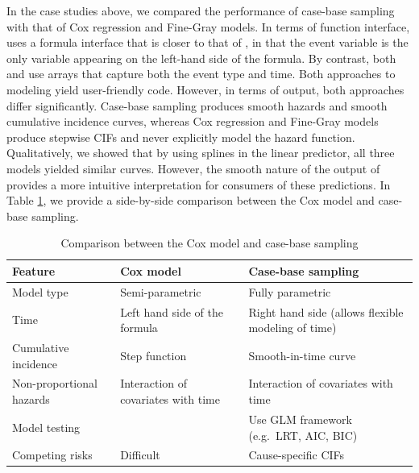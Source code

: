 In the case studies above, we compared the performance of case-base
sampling with that of Cox regression and Fine-Gray models. In terms of
function interface,  uses a formula interface that is
closer to that of , in that the event variable is the only
variable appearing on the left-hand side of the formula. By contrast,
both  and  use arrays
that capture both the event type and time. Both approaches to modeling
yield user-friendly code. However, in terms of output, both approaches
differ significantly. Case-base sampling produces smooth hazards and
smooth cumulative incidence curves, whereas Cox regression and Fine-Gray
models produce stepwise CIFs and never explicitly model the hazard
function. Qualitatively, we showed that by using splines in the linear
predictor, all three models yielded similar curves. However, the smooth
nature of the output of  provides a more intuitive
interpretation for consumers of these predictions. In Table
\ref{tab:compCBvsCox}, we provide a side-by-side comparison between the
Cox model and case-base sampling.

\begin{table}
\caption{\label{tab:compCBvsCox}Comparison between the Cox model and case-base sampling}
\centering
\begin{tabular}[t]{llp{5cm}}
\toprule
Feature & Cox model & Case-base sampling\\
\midrule
Model type & Semi-parametric & Fully parametric\\
Time & Left hand side of the formula & Right hand side (allows flexible modeling of time)\\
Cumulative incidence & Step function & Smooth-in-time curve\\
Non-proportional hazards & Interaction of covariates with time & Interaction of covariates with time\\
Model testing &  & Use GLM framework \newline (e.g.\ LRT, AIC, BIC)\\
\addlinespace
Competing risks & Difficult & Cause-specific CIFs\\
\bottomrule
\end{tabular}
\end{table}

